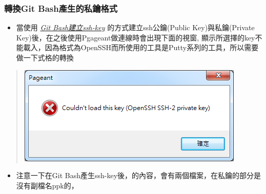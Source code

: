 \documentclass[letterpaper,10pt,english]{sphinxmanual}
\begin{document}
\subsubsection{轉換Git Bash產生的私鑰格式}
\label{_doc/writing/index:git-bash}\begin{itemize}
\item {} 
當使用 {\hyperref[_doc/writing/index:ssh-key-gitbash]{\emph{Git Bash建立ssh-key}}} 的方式建立ssh公鑰(Public Key)與私鑰(Private Key)後，在之後使用Pgageant做連線時會出現下面的視窗, 顯示所選擇的key不能載入，因為格式為OpenSSH而所使用的工具是Putty系列的工具，所以需要做一下式格的轉換

\end{itemize}
\begin{quote}

\includegraphics{openssh-putty-001.png}
\end{quote}
\begin{itemize}
\item {} 
注意一下在Git Bash產生ssh-key後，的內容，會有兩個檔案，在私鑰的部分是沒有副檔名ppk的，

\end{itemize}
\end{document}
